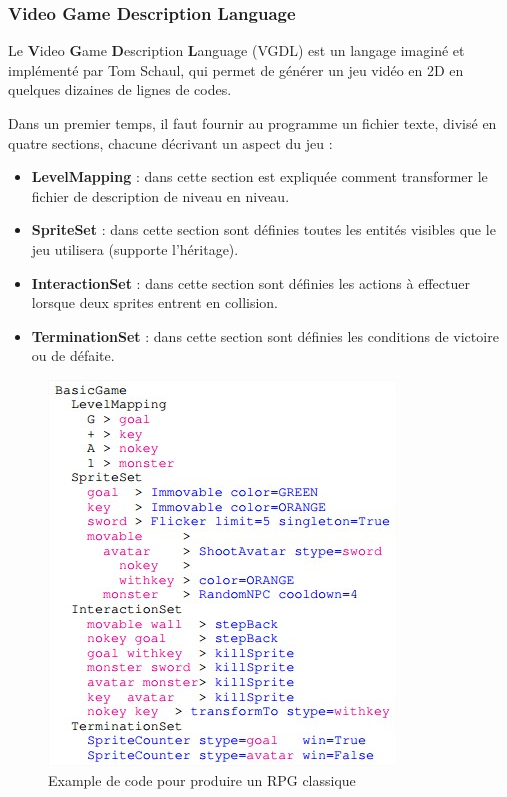 \documentclass[a4paper, 12pt]{article} %
\begin{document}
\newpage
\subsubsection{Video Game Description Language}

Le \textbf{V}ideo \textbf{G}ame \textbf{D}escription \textbf{L}anguage\cite{schaul2013video} (VGDL) est un langage imaginé et implémenté par Tom Schaul, qui permet de générer un jeu vidéo en 2D en quelques dizaines de lignes de codes.

Dans un premier temps, il faut fournir au programme un fichier texte, divisé en quatre sections, chacune décrivant un aspect du jeu :

\begin{itemize}
	\item \textbf{LevelMapping} : dans cette section est expliquée comment transformer le fichier de description de niveau en niveau.
	\item \textbf{SpriteSet} : dans cette section sont définies toutes les entités visibles que le jeu utilisera (supporte l'héritage).
	\item \textbf{InteractionSet} : dans cette section sont définies les actions à effectuer lorsque deux sprites entrent en collision.
	\item \textbf{TerminationSet} : dans cette section sont définies les conditions de victoire ou de défaite.
\end{itemize}

\begin{figure}[!h]%
	\begin{center} 
		\includegraphics[width=0.60\columnwidth]{images/vgdlgame.jpg}%
		\caption{Example de code pour produire un RPG classique}%
	\end{center}
\end{figure}
\end{document}
